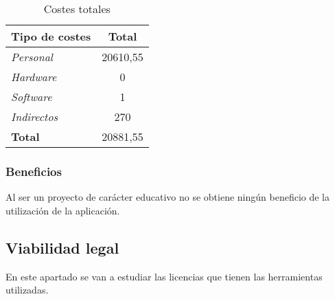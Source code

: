 \begin{itemize}
\begin{table}[ht!]
    \centering
    \resizebox{6.5cm}{!} {
    \begin{tabular}{l c}
    
         \textbf{Tipo de costes}     &  \textbf{Total } \\ \hline
         \textit{Personal}       & 20610,55\text{\euro} \\ 
         \textit{Hardware}    & 0\text{\euro} \\  
         \textit{Software}      & 1\text{\euro} \\ 
         \textit{Indirectos}      &270\text{\euro}   \\ \hline
         \textbf{Total}         &20881,55\text{\euro}\\ 
    \end{tabular}}
    \caption{Costes totales}
    \label{tab:my_label}
\end{table}
\end{itemize}

\subsubsection{Beneficios}
Al ser un proyecto de carácter educativo no se obtiene ningún beneficio de la utilización de la aplicación.

\newpage
\subsection{Viabilidad legal}
En este apartado se van a estudiar las licencias que tienen las herramientas utilizadas.

